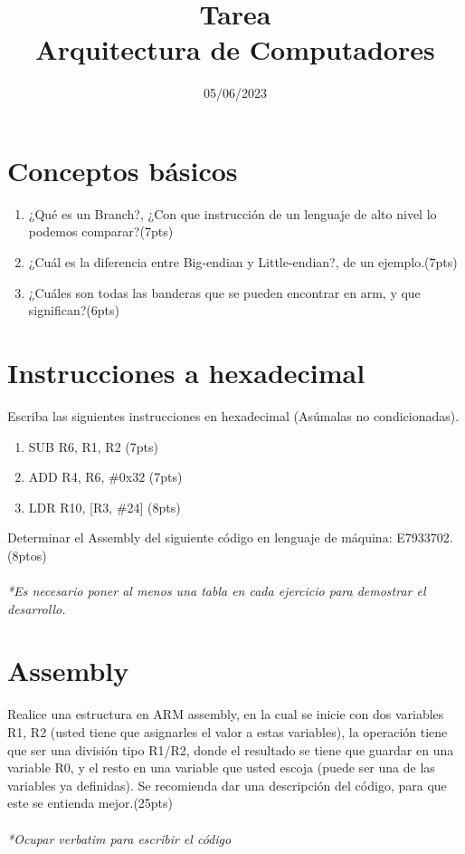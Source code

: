 \documentclass[spanish, fleqn, oneside]{article}
\title{Tarea \tnum\\
       Arquitectura de Computadores}
\date{05/06/2023}
\begin{document}
\maketitle

\section{Conceptos básicos}
\begin{enumerate}
    \item ¿Qué es un Branch?, ¿Con que instrucción de un lenguaje de alto nivel lo podemos comparar?(7pts)                                         
    
    \item  ¿Cuál es la diferencia entre Big-endian y Little-endian?, de un ejemplo.(7pts)  

    \item ¿Cuáles son todas las banderas que se pueden encontrar en arm, y que significan?(6pts) 

\end{enumerate}

\newpage
\section{Instrucciones a hexadecimal}

Escriba las siguientes instrucciones en hexadecimal (Asúmalas no condicionadas). 

\begin{enumerate}
    \item SUB R6, R1, R2 (7pts)
 
    \item ADD R4, R6, $\#$0x32 (7pts)

    \item LDR R10, [R3, $\#$24] (8pts)

\end{enumerate}

Determinar el Assembly del siguiente código en lenguaje de máquina: E7933702.(8ptos)\\\\
\textit{*Es necesario poner al menos una tabla en cada ejercicio para demostrar el desarrollo.}
\newpage

\section{Assembly}

Realice una estructura en ARM assembly, en la cual se inicie con dos variables R1, R2 (usted tiene que asignarles el valor a estas variables), la operación tiene que ser una división tipo R1/R2, donde el resultado se tiene que guardar en una variable R0, y el resto en una variable que usted escoja (puede ser una de las variables ya definidas). Se recomienda dar una descripción del código, para que este se entienda mejor.(25pts)\\\\
\textit{*Ocupar verbatim para escribir el código}
\end{document}

